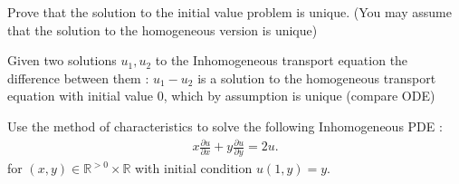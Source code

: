 \begin{question}[subtitle=Inhomogeneous Transport Equation (d)]
	Prove  that the solution to the initial value problem is unique. (You may assume that the solution to the homogeneous version is unique)
\end{question}
\begin{solution}
  Given two solutions $u_1,u_2$ to the Inhomogeneous transport equation the difference between them : $u_1-u_2$ is a solution to the homogeneous transport equation with initial value 0,
  which by assumption is unique (compare ODE)
\end{solution}
\begin{question}[subtitle=Method of characteristics for an Inhomogeneous PDE]
 Use the method of characteristics to solve the following Inhomogeneous PDE : 
 \begin{align*}
  x \frac{\partial u}{\partial x} + y \frac{\partial u}{\partial y} = 2u  
 .\end{align*}
 for $(x,y) \in \mathbb{R}^{>0}\times \mathbb{R} $ with initial condition $u(1,y) = y$.
\end{question}
